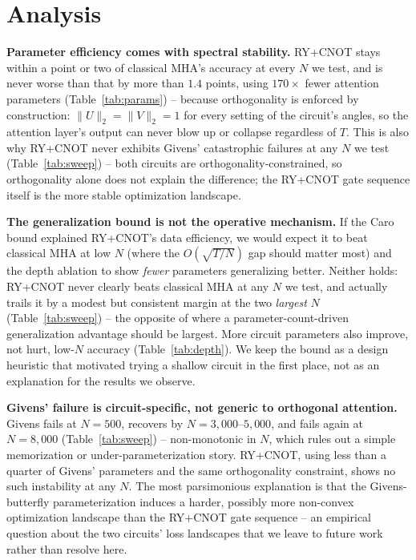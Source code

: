 \documentclass[10pt,letterpaper]{article}
\theoremstyle{plain}
\theoremstyle{definition}
\begin{document}
\section{Analysis}
\label{sec:analysis}

\textbf{Parameter efficiency comes with spectral stability.} RY+CNOT stays
within a point or two of classical MHA's accuracy at every $N$ we test,
and is never worse than that by more than $1.4$ points, using $170\times$
fewer attention parameters (Table~\ref{tab:params}) -- because orthogonality is enforced by
construction: $\|U\|_2=\|V\|_2=1$ for every setting of the circuit's
angles, so the attention layer's output can never blow up or collapse
regardless of $T$. This is also why RY+CNOT never exhibits Givens'
catastrophic failures at any $N$ we test (Table~\ref{tab:sweep}) -- both
circuits are orthogonality-constrained, so orthogonality alone does not
explain the difference; the RY+CNOT gate sequence itself is the more
stable optimization landscape.

\textbf{The generalization bound is not the operative mechanism.} If the
Caro bound explained RY+CNOT's data efficiency, we would expect it to beat
classical MHA at low $N$ (where the $O(\sqrt{T/N})$ gap should matter most)
and the depth ablation to show \emph{fewer} parameters generalizing better.
Neither holds: RY+CNOT never clearly beats classical MHA at any $N$ we
test, and actually trails it by a modest but consistent margin at the two
\emph{largest} $N$ (Table~\ref{tab:sweep}) -- the opposite of where a
parameter-count-driven generalization advantage should be largest. More
circuit parameters also improve, not hurt, low-$N$ accuracy
(Table~\ref{tab:depth}). We keep the bound as a design
heuristic that motivated trying a shallow circuit in the first place, not
as an explanation for the results we observe.

\textbf{Givens' failure is circuit-specific, not generic to orthogonal
attention.} Givens fails at $N{=}500$, recovers by $N{=}3{,}000$--$5{,}000$,
and fails again at $N{=}8{,}000$ (Table~\ref{tab:sweep}) -- non-monotonic
in $N$, which rules out a simple memorization or under-parameterization
story. RY+CNOT, using less than a quarter of Givens' parameters and the
same orthogonality constraint, shows no such instability at any $N$. The
most parsimonious explanation is that the Givens-butterfly parameterization
induces a harder, possibly more non-convex optimization landscape than the
RY+CNOT gate sequence -- an empirical question about the two circuits'
loss landscapes that we leave to future work rather than resolve here.
\end{document}
